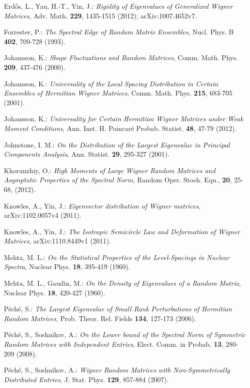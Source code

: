 \documentclass[reqno, 10pt]{amsart}
\theoremstyle{definition}
\theoremstyle{remark}
\numberwithin{equation}{section}
\numberwithin{thm}{section}
\begin{document}
\begin{thebibliography}{}
 Erd\H{o}s, L., Yau, H.-T., Yin, J.: \emph{Rigidity of Eigenvalues of Generalized Wigner Matrices}, Adv. Math. \textbf{229}, 1435-1515 (2012); arXiv:1007.4652v7.

 Forrester, P.: \emph{The Spectral Edge of Random Matrix Ensembles}, Nucl. Phys. B \textbf{402}, 709-728 (1993).

 Johansson, K.: \emph{Shape Fluctuations and Random Matrices}, Comm. Math. Phys. \textbf{209}, 437-476 (2000).

 Johansson, K.: \emph{Universality of the Local Spacing Distribution in Certain Ensembles of Hermitian Wigner Matrices}, Comm. Math. Phys. \textbf{215}, 683-705 (2001).

 Johansson, K.: \emph{Universality for Certain Hermitian Wigner Matrices under Weak Moment Conditions}, Ann. Inst. H. Poincar\'e Probab. Statist. \textbf{48}, 47-79 (2012).

 Johnstone, I. M.: \emph{On the Distribution of the Largest Eigenvalue in Principal Components Analysis}, Ann. Statist. \textbf{29}, 295-327 (2001).

 Khorunzhiy, O.: \emph{High Moments of Large Wigner Random Matrices and Asymptotic Properties of the Spectral Norm}, Random Oper. Stoch. Equ., \textbf{20}, 25-68, (2012).

 Knowles, A., Yin, J.: \emph{Eigenvector distribution of Wigner matrices}, arXiv:1102.0057v4 (2011).

 Knowles, A., Yin, J.: \emph{The Isotropic Semicircle Law and Deformation of Wigner Matrices}, arXiv:1110.8449v1 (2011).

 Mehta, M. L.: \emph{On the Statistical Properties of the Level-Spacings in Nuclear Spectra}, Nuclear Phys. \textbf{18}, 395-419 (1960).

 Mehta, M. L., Gaudin, M.: \emph{On the Density of Eigenvalues of a Random Matrix}, Nuclear Phys. \textbf{18}, 420-427 (1960).

 P\'ech\'e, S.: \emph{The Largest Eigenvalue of Small Rank Perturbations of Hermitian Random Matrices}, Prob. Theor. Rel. Fields \textbf{134}, 127-173 (2006).

 P\'ech\'e, S., Soshnikov, A.: \emph{On the Lower bound of the Spectral Norm of Symmetric Random Matrices with Independent Entries}, Elect. Comm. in Probab. \textbf{13}, 280-209 (2008).

 P\'ech\'e, S., Soshnikov, A.: \emph{Wigner Random Matrices with Non-Symmetrically Distributed Entries}, J. Stat. Phys. \textbf{129}, 857-884 (2007).


\end{thebibliography}
\end{document}
